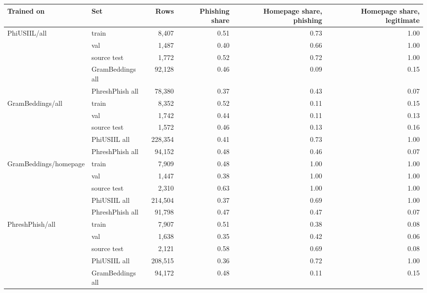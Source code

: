 {\footnotesize\setlength{\tabcolsep}{4pt}
\begin{tabular}{llrrrr}
\toprule
\textbf{Trained on} & \textbf{Set} & \textbf{Rows} & \textbf{Phishing share} & \textbf{Homepage share, phishing} & \textbf{Homepage share, legitimate} \\
\midrule
PhiUSIIL/all & train & 8{,}407 & 0.51 & 0.73 & 1.00 \\
 & val & 1{,}487 & 0.40 & 0.66 & 1.00 \\
 & source test & 1{,}772 & 0.52 & 0.72 & 1.00 \\
 & GramBeddings all & 92{,}128 & 0.46 & 0.09 & 0.15 \\
 & PhreshPhish all & 78{,}380 & 0.37 & 0.43 & 0.07 \\
\addlinespace
GramBeddings/all & train & 8{,}352 & 0.52 & 0.11 & 0.15 \\
 & val & 1{,}742 & 0.44 & 0.11 & 0.13 \\
 & source test & 1{,}572 & 0.46 & 0.13 & 0.16 \\
 & PhiUSIIL all & 228{,}354 & 0.41 & 0.73 & 1.00 \\
 & PhreshPhish all & 94{,}152 & 0.48 & 0.46 & 0.07 \\
\addlinespace
GramBeddings/homepage & train & 7{,}909 & 0.48 & 1.00 & 1.00 \\
 & val & 1{,}447 & 0.38 & 1.00 & 1.00 \\
 & source test & 2{,}310 & 0.63 & 1.00 & 1.00 \\
 & PhiUSIIL all & 214{,}504 & 0.37 & 0.69 & 1.00 \\
 & PhreshPhish all & 91{,}798 & 0.47 & 0.47 & 0.07 \\
\addlinespace
PhreshPhish/all & train & 7{,}907 & 0.51 & 0.38 & 0.08 \\
 & val & 1{,}638 & 0.35 & 0.42 & 0.06 \\
 & source test & 2{,}121 & 0.58 & 0.69 & 0.08 \\
 & PhiUSIIL all & 208{,}515 & 0.36 & 0.72 & 1.00 \\
 & GramBeddings all & 94{,}172 & 0.48 & 0.11 & 0.15 \\
\bottomrule
\end{tabular}
}
